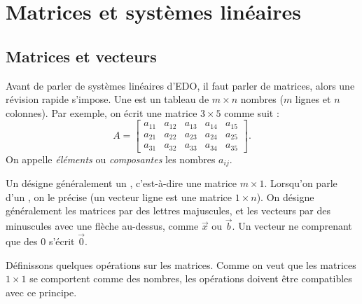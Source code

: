 
\sectionnewpage
\section{Matrices et systèmes linéaires} \label{sec:matrix}


\subsection{Matrices et vecteurs}

Avant de parler de systèmes linéaires d'EDO, il faut parler de matrices, alors une révision rapide s'impose. Une \emph{} est un tableau de $m
\times n$ nombres ($m$ lignes et $n$ colonnes). Par exemple, on écrit une matrice $3 \times 5$ comme suit :
\begin{equation*}
A = 
\begin{bmatrix}
a_{11} & a_{12} & a_{13} & a_{14} & a_{15} \\
a_{21} & a_{22} & a_{23} & a_{24} & a_{25} \\
a_{31} & a_{32} & a_{33} & a_{34} & a_{35}
\end{bmatrix} .
\end{equation*}
On appelle \emph{éléments}
ou \emph{composantes} les nombres $a_{ij}$.

Un \emph{} désigne généralement un
\emph{}, c'est-à-dire une matrice $m \times 1$.
Lorsqu'on parle d'un \emph{}, on le précise (un vecteur ligne est une matrice $1 \times n$).
On désigne généralement les matrices par des lettres majuscules, et les vecteurs par des minuscules avec une flèche au-dessus, comme $\vec{x}$ ou $\vec{b}$. Un vecteur ne comprenant que des 0 s'écrit $\vec{0}$.

Définissons quelques opérations sur les matrices. Comme on veut que les matrices $1 \times 1$ se comportent comme des nombres, les opérations doivent être compatibles avec ce principe.

